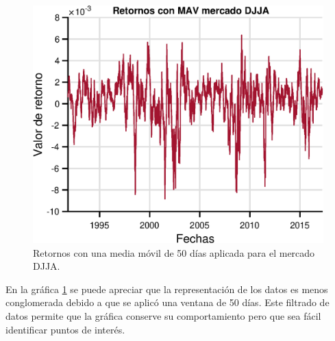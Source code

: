 \begin{figure}[h!]
	\centering
	\includegraphics[width=12cm]{figures/MAVreturnseps}
	\caption{Retornos con una media móvil de 50 días aplicada para el mercado DJJA.}
	\label{fig:mavreturnseps}
\end{figure}

En la gráfica \ref{fig:mavreturnseps} se puede apreciar que la representación de los datos es menos conglomerada debido a que se aplicó una ventana de 50 días. Este filtrado de datos permite que la gráfica conserve su comportamiento pero que sea fácil identificar puntos de interés.



